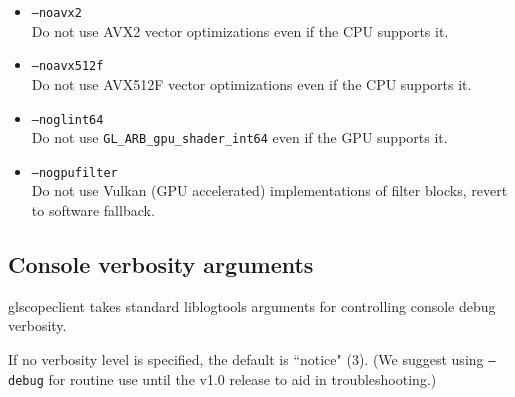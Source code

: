 \begin{itemize}

\item \texttt{--noavx2}\\
Do not use AVX2 vector optimizations even if the CPU supports it.

\item \texttt{--noavx512f}\\
Do not use AVX512F vector optimizations even if the CPU supports it.

\item \texttt{--noglint64}\\
Do not use \texttt{GL\_ARB\_gpu\_shader\_int64} even if the GPU supports it.

\item \texttt{--nogpufilter}\\
Do not use Vulkan (GPU accelerated) implementations of filter blocks, revert to software fallback.

\end{itemize}

\subsection{Console verbosity arguments}

glscopeclient takes standard liblogtools arguments for controlling console debug verbosity.

If no verbosity level is specified, the default is ``notice" (3). (We suggest using \texttt{--debug} for routine use
until the v1.0 release to aid in troubleshooting.)

